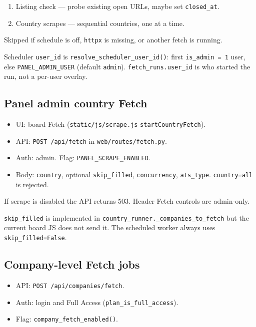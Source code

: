 \documentclass[11pt,a4paper]{article}
\begin{document}
\begin{enumerate}
  \item Listing check --- probe existing open URLs, maybe set
        \texttt{closed\_at}.
  \item Country scrapes --- sequential countries, one at a time.
\end{enumerate}

Skipped if schedule is off, \texttt{httpx} is missing, or another fetch is
running.

Scheduler \texttt{user\_id} is \texttt{resolve\_scheduler\_user\_id()}: first
\texttt{is\_admin = 1} user, else \texttt{PANEL\_ADMIN\_USER} (default
\texttt{admin}). \texttt{fetch\_runs.user\_id} is who started the run, not a
per-user overlay.

\subsection{Panel admin country Fetch}

\begin{itemize}
  \item UI: board Fetch (\texttt{static/js/scrape.js}
        \texttt{startCountryFetch}).
  \item API: \texttt{POST /api/fetch} in \texttt{web/routes/fetch.py}.
  \item Auth: admin. Flag: \texttt{PANEL\_SCRAPE\_ENABLED}.
  \item Body: \texttt{country}, optional \texttt{skip\_filled},
        \texttt{concurrency}, \texttt{ats\_type}. \texttt{country=all} is
        rejected.
\end{itemize}

If scrape is disabled the API returns 503. Header Fetch controls are
admin-only.

\texttt{skip\_filled} is implemented in
\texttt{country\_runner.\_companies\_to\_fetch} but the current board JS does
not send it. The scheduled worker always uses \texttt{skip\_filled=False}.

\subsection{Company-level Fetch jobs}

\begin{itemize}
  \item API: \texttt{POST /api/companies/fetch}.
  \item Auth: login and Full Access (\texttt{plan\_is\_full\_access}).
  \item Flag: \texttt{company\_fetch\_enabled()}.
\end{itemize}
\end{document}
